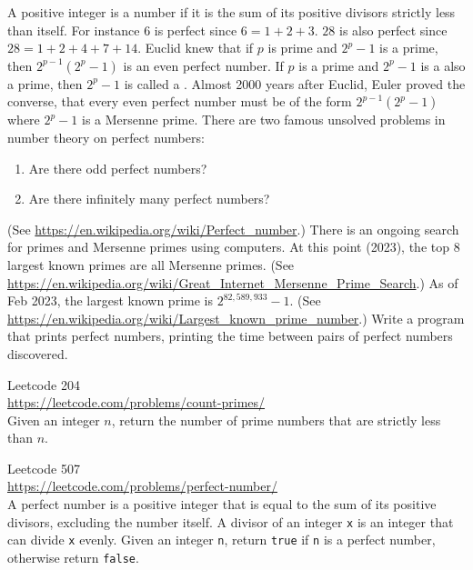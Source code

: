 \begin{ex}
  A positive integer is a  number if it is the
  sum of its positive divisors strictly less than itself.
  For instance $6$ is perfect since $6 = 1 + 2 + 3$.
  $28$ is also perfect since $28 = 1 + 2 + 4 + 7 + 14$.
  Euclid knew that if $p$ is prime and $2^p - 1$ is a prime,
  then $2^{p-1}(2^p - 1)$ is an even perfect number.
  If $p$ is a prime and $2^p - 1$ is a also a prime,
  then $2^p - 1$ is called a .
  Almost 2000 years after Euclid, Euler proved the converse, that
  every even perfect number must be of the form
  $2^{p-1}(2^p - 1)$ where $2^p - 1$ is a Mersenne prime.
  There are two famous unsolved problems in number theory on perfect
  numbers:
  \begin{enumerate}[nosep]
  \item Are there odd perfect numbers?
  \item Are there infinitely many perfect numbers?
  \end{enumerate}
  (See \url{https://en.wikipedia.org/wiki/Perfect_number}.)
  There is an ongoing search for primes and Mersenne primes using
  computers.
  At this point (2023), the top 8 largest known primes are all
  Mersenne primes.
  (See \url{https://en.wikipedia.org/wiki/Great_Internet_Mersenne_Prime_Search}.)
  As of Feb 2023, the largest known prime is $2^{82,589,933} - 1$.
  (See \url{https://en.wikipedia.org/wiki/Largest_known_prime_number}.)
  Write a program that prints perfect numbers, printing the time between pairs of
  perfect numbers discovered.
\end{ex}


\begin{ex}
  Leetcode 204 \\
  \url{https://leetcode.com/problems/count-primes/} \\
  Given an integer $n$, return the number of prime numbers that are strictly
  less than $n$.
\end{ex}

\begin{ex}
  Leetcode 507 \\
  \url{https://leetcode.com/problems/perfect-number/} \\
  A perfect number is a positive integer that is equal to the sum of its
  positive divisors, excluding the number itself.
  A divisor of an integer \verb!x! is an integer that can divide \verb!x!
  evenly.
  Given an integer \verb!n!, return \verb!true! if \verb!n! is a perfect number,
  otherwise return \verb!false!.
\end{ex}

